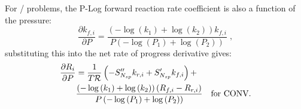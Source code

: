 \documentclass[12pt,number,sort&compress]{elsarticle}
\begin{document}
For \conv/ problems, the P-Log forward reaction rate coefficient is also a function of the pressure:
\begin{equation}
 \frac{\partial {k_{f, i}} }{\partial P } = \frac{\left(- \log{\left (k_{1} \right )} + \log{\left (k_{2} \right )}\right) {k_{f, i}}}{P \left(- \log{\left (P_{1} \right )} + \log{\left (P_{2} \right )}\right)}\;,
\end{equation}
substituting this into the net rate of progress derivative gives:
\begin{align}
 \label{e:dropi_plog_de}
 \frac{\partial R_{i} }{\partial P } &= \frac{1}{T \Ru/} \left(- S^{\prime\prime}_{\ns/} {k_{r, i}} + S^{\prime}_{\ns/} {k_{f, i}}\right) + & \nonumber \\
				     &  \frac{\left(- \log{\left (k_{1} \right )} + \log{\left (k_{2} \right )}\right) \left({R_{f, i}} - {R_{r, i}}\right)}{P \left(- \log{\left (P_{1} \right )} + \log{\left (P_{2} \right )}\right)} & \text{\dconv/.}
\end{align}
\end{document}
